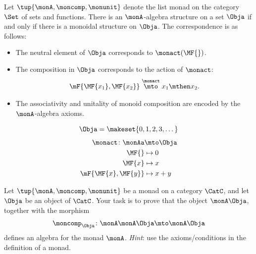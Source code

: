 \begin{proposition}\label{prop:monad-monoid}
    Let $\tup{\monA, \moncomp, \monunit}$ denote the list monad on the category $\Set$ of sets and functions. There is an $\monA$-algebra structure on a set $\Obja$ if and only if there
    is a monoidal structure on $\Obja$.
    The correspondence is as follows:
    \begin{itemize}
        \item The neutral element of $\Obja$ corresponds to $\monact(\MF{})$.
        \item The composition in $\Obja$ corresponds to the action of $\monact$:
              \begin{equation}
                  \mF{\MF{x_1}, \MF{x_2}} \stackrel{\monact}{\mto} x_1 \mthen x_2.
              \end{equation}
        \item The associativity and unitality of monoid composition are encoded by the $\monA$-algebra axioms.
    \end{itemize}
\end{proposition}
\begin{equation}\label{eq:addition-algebra-1}
    \Obja = \makeset{0, 1, 2, 3, \dots }
\end{equation}
\begin{equation}\label{eq:addition-algebra-2}
    \begin{aligned}
        \monact \colon \monAa & \mto \Obja \\
        \MF{}                 & \mapsto 0 \\
        \MF{x}                & \mapsto x \\
        \mF{\MF{x}, \MF{y}}   & \mapsto x + y
    \end{aligned}
\end{equation}

\begin{gradedexercise}
    \label{ex:HwkFreeAlgebras}
    Let $\tup{\monA, \moncomp, \monunit}$ be a monad on a category $\CatC$, and let $\Obja$ be an object of $\CatC$.
    Your task is to prove that the object $\monA \Obja$, together with the morphism
    \begin{equation}
        \moncomp_\Obja \colon \monA \monA \Obja \mto \monA \Obja
    \end{equation}
    defines an algebra for the monad $\monA$.
    \emph{Hint}: use the axioms/conditions in the definition of a monad.
\end{gradedexercise}
